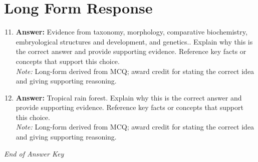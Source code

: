\documentclass[12pt]{article}
\begin{document}
\section*{Long Form Response}
\begin{enumerate}[label=\arabic*.]
\setcounter{enumi}{10}
\item \textbf{Answer:} Evidence from taxonomy, morphology, comparative biochemistry, embryological structures and development, and genetics.. Explain why this is the correct answer and provide supporting evidence. Reference key facts or concepts that support this choice.
\\ \textit{Note:} Long-form derived from MCQ; award credit for stating the correct idea and giving supporting reasoning.
\item \textbf{Answer:} Tropical rain forest. Explain why this is the correct answer and provide supporting evidence. Reference key facts or concepts that support this choice.
\\ \textit{Note:} Long-form derived from MCQ; award credit for stating the correct idea and giving supporting reasoning.
\end{enumerate}

\vfill
\noindent\textit{End of Answer Key}
\end{document}
